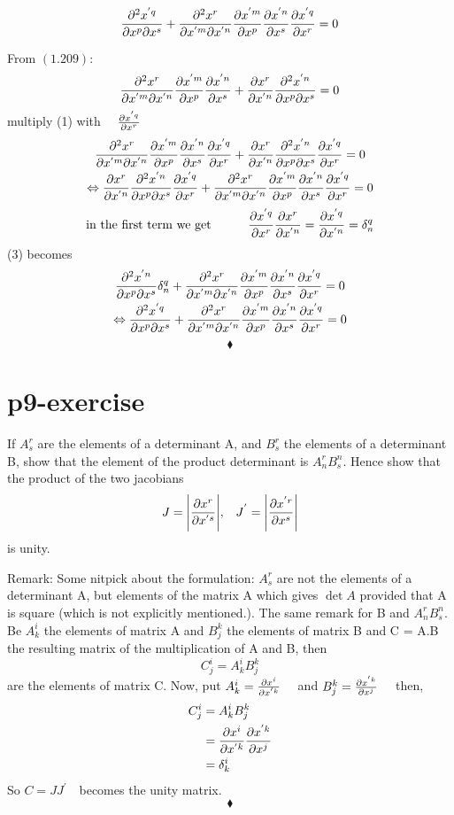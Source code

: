 \begin{tcolorbox}
$$\pdv{x^{'q}}{x^{p}}{x^{s}}+\pdv{x^{r}}{x^{'m}}{x^{'n}}\pdv{x^{'m}}{x^{p}}\pdv{x^{'n}}{x^{s}}\pdv{x^{'q}}{x^{r}} = 0 $$
\end{tcolorbox}
From $\mathbf{(1.209)}$:
\begin{gather} 
\pdv{x^r}{x^{'m}}{x^{'n}}\pdv{x^{'m}}{x^{p}}\pdv{x^{'n}}{x^{s}}+\pdv{x^r}{x^{'n}}\pdv{x^{'n}}{x^p}{x^{s}} = 0
\end{gather}
 multiply (1)  with $\quad\pdv{x^{'q}}{x^{r}}$
\begin{gather} 
\pdv{x^r}{x^{'m}}{x^{'n}}\pdv{x^{'m}}{x^{p}}\pdv{x^{'n}}{x^{s}}\pdv{x^{'q}}{x^{r}}+\pdv{x^r}{x^{'n}}\pdv{x^{'n}}{x^p}{x^{s}}\pdv{x^{'q}}{x^{r}} = 0\\
\Leftrightarrow\pdv{x^r}{x^{'n}}\pdv{x^{'n}}{x^p}{x^{s}}\pdv{x^{'q}}{x^{r}}+ \pdv{x^r}{x^{'m}}{x^{'n}}\pdv{x^{'m}}{x^{p}}\pdv{x^{'n}}{x^{s}}\pdv{x^{'q}}{x^{r}}= 0
\end{gather}
\begin{gather} 
\text{\centering in the first term we get\quad\quad}\quad \pdv{x^{'q}}{x^{r}}\pdv{x^r}{x^{'n}} = \pdv{x^{'q}}{x^{'n}} = \delta_n^q
\end{gather}
(3) becomes
\begin{gather} 
\pdv{x^{'n}}{x^p}{x^{s}}\delta_n^q + \pdv{x^r}{x^{'m}}{x^{'n}}\pdv{x^{'m}}{x^{p}}\pdv{x^{'n}}{x^{s}}\pdv{x^{'q}}{x^{r}}=  0\\
\Leftrightarrow\pdv{x^{'q}}{x^p}{x^{s}} + \pdv{x^r}{x^{'m}}{x^{'n}}\pdv{x^{'m}}{x^{p}}\pdv{x^{'n}}{x^{s}}\pdv{x^{'q}}{x^{r}}= 0
\end{gather} 
$$\blacklozenge$$
\pagebreak[4]



\section{p9-exercise}

\begin{tcolorbox}
If $A_s^r$ are the elements of a determinant A, and $B_s^r$ the elements of a determinant B, show that the element of the product determinant is $A_n^rB^n_s$. Hence show that the product of the two jacobians
$$J =\Bigg|\pdv{x^{r}}{x^{'s}}\Bigg|\text{,}\quad J^{'} = \Bigg|\pdv{x^{'r}}{x^{s}}\Bigg|$$
is unity.
\end{tcolorbox}
Remark: Some nitpick about the formulation: $A_s^r$ are not the elements of a determinant A, but elements of the matrix A which gives $\det{A}$ provided that A is square (which is not explicitly mentioned.). The same remark for B and $A_n^rB^n_s$.\\
Be $A^i_k $ the elements of matrix A and $B^k_j $ the elements of matrix B and C = A.B the resulting matrix of the multiplication of A and B, then
$$C^i_j  = A^i_kB^k_j $$
are the elements of matrix C.
Now, put $A^i_k =\pdv{x^{i}}{x^{'k}} \quad$ and $B^k_j =\pdv{x^{'k}}{x^{j}} \quad$ then,
\begin{align*}
C^{i}_{j}  &= A^{i}_{k}B^{k}_{j} \\
&=\pdv{x^{i}}{x^{'k}}\pdv{x^{'k}}{x^{j}}\\
&= \delta^{i}_{k}
\end{align*}
So $C = JJ^{'}\quad$becomes the unity matrix. 
$$\blacklozenge$$
\pagebreak[4]

